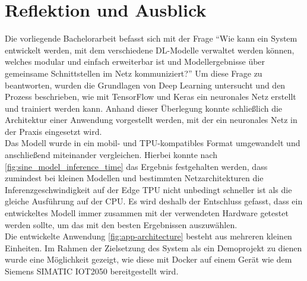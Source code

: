 \chapter{Reflektion und Ausblick}
Die vorliegende Bachelorarbeit befasst sich mit der Frage
\enquote{Wie kann ein System entwickelt werden, mit dem verschiedene DL-Modelle
verwaltet werden können, welches modular und einfach erweiterbar ist
und Modellergebnisse über gemeinsame Schnittstellen im Netz kommuniziert?}
Um diese Frage zu beantworten, wurden
die Grundlagen von Deep Learning untersucht
und den Prozess beschrieben, wie mit TensorFlow und Keras
ein neuronales Netz erstellt und trainiert werden kann.
Anhand dieser Überlegung konnte schließlich die Architektur einer Anwendung
vorgestellt werden, mit der ein neuronales Netz in der Praxis eingesetzt wird.\\[8pt]
Das Modell wurde in ein mobil- und TPU-kompatibles Format umgewandelt
und anschließend miteinander vergleichen.
Hierbei konnte nach \autoref{fig:sine_model_inference_time}
das Ergebnis festgehalten werden,
dass zumindest bei kleinen Modellen und bestimmten Netzarchitekturen
die Inferenzgeschwindigkeit
auf der Edge TPU nicht unbedingt schneller ist als die gleiche Ausführung auf der CPU.
Es wird deshalb der Entschluss gefasst, dass
ein entwickeltes Modell immer zusammen mit der verwendeten Hardware getestet
werden sollte, um das mit den besten Ergebnissen auszuwählen.\\[8pt]
Die entwickelte Anwendung \eqref{fig:app-architecture} besteht aus mehreren kleinen
Einheiten. Im Rahmen der Zielsetzung des System als ein Demoprojekt zu dienen
wurde eine Möglichkeit gezeigt, wie diese mit Docker auf einem Gerät wie dem Siemens
SIMATIC IOT2050 bereitgestellt wird.